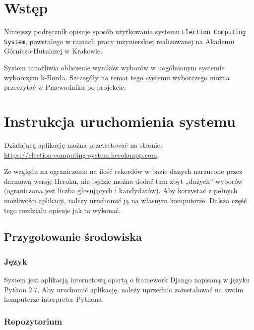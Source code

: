 \documentclass[pdflatex,11pt]{../aghdoc}
\author{Tomasz Kasprzyk, Daniel Ogiela, Jakub Stępak}
\date{2016}
\begin{document}
\titlepages

\tableofcontents


\chapter{Wstęp}
\label{cha:wstep}

Niniejszy podręcznik opisuje sposób użytkowania systemu \texttt{Election Computing System}, powstałego w ramach pracy inżynierskiej realizowanej na Akademii Górniczo-Hutniczej w Krakowie.

System umożliwia obliczenie wyników wyborów w uogólnionym systemie wyborczym k-Borda. Szczegóły na temat tego systemu wyborczego można przeczytać w Przewodniku po projekcie.


\chapter{Instrukcja uruchomienia systemu}
\label{cha:uruchomienie}

Działającą aplikację można przetestować na stronie: \\ \url{https://election-computing-system.herokuapp.com}. 

Ze względu na ograniczenia na ilość rekordów w bazie danych narzucone przez darmową wersję Heroku, nie będzie można dodać tam zbyt „dużych” wyborów (ograniczona jest liczba głosujących i kandydatów). Aby korzystać z pełnych możliwości aplikacji, należy uruchomić ją na własnym komputerze. Dalsza część tego rozdziału opisuje jak to wykonać.

\section{Przygotowanie środowiska}
\label{sec:srodowisko}

\subsection{Język}
\label{subsec:jezyk}

System jest aplikacją internetową opartą o framework Django napisaną w języku Python 2.7.
Aby uruchomić aplikację, należy uprzednio zainstalować na swoim komputerze interpreter Pythona.

\subsection{Repozytorium}
\label{subsec:repo}
\end{document}
